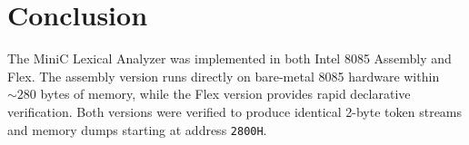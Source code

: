 \documentclass[11pt,a4paper]{article}
\begin{document}
\section{Conclusion}
The MiniC Lexical Analyzer was implemented in both Intel 8085 Assembly and Flex. The assembly version runs directly on bare-metal 8085 hardware within $\sim 280$ bytes of memory, while the Flex version provides rapid declarative verification. Both versions were verified to produce identical 2-byte token streams and memory dumps starting at address \texttt{2800H}.
\end{document}
